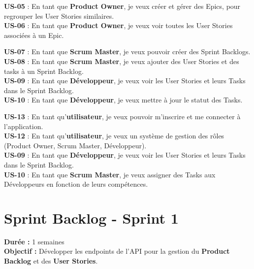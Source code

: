 \documentclass[a4paper,12pt]{article}
\begin{document}
\begin{tcolorbox}[colframe=darkblue,colback=lightgray,title=\textbf{Epic 2 : Gestion des Epics}]
\textbf{US-05} : En tant que \textbf{Product Owner}, je veux créer et gérer des Epics, pour regrouper les User Stories similaires.\\
\textbf{US-06} : En tant que \textbf{Product Owner}, je veux voir toutes les User Stories associées à un Epic.
\end{tcolorbox}

\begin{tcolorbox}[colframe=darkblue,colback=lightgray,title=\textbf{Epic 3 : Gestion du Sprint Backlog}]
\textbf{US-07} : En tant que \textbf{Scrum Master}, je veux pouvoir créer des Sprint Backlogs.\\
\textbf{US-08} : En tant que \textbf{Scrum Master}, je veux ajouter des User Stories et des tasks à un Sprint Backlog.\\
\textbf{US-09} : En tant que \textbf{Développeur}, je veux voir les User Stories et leurs Tasks dans le Sprint Backlog.\\
\textbf{US-10} : En tant que \textbf{Développeur}, je veux mettre à jour le statut des Tasks.
\end{tcolorbox}
\begin{tcolorbox}[colframe=darkblue,colback=lightgray,title=\textbf{Epic 5 : Gestion des utilisateurs et des rôles}]
\textbf{US-13} : En tant qu’\textbf{utilisateur}, je veux pouvoir m’inscrire et me connecter à l’application.\\
\textbf{US-12} : En tant qu’\textbf{utilisateur},  je veux un système de gestion des rôles (Product Owner, Scrum Master, Développeur).\\
\textbf{US-09} : En tant que \textbf{Développeur}, je veux voir les User Stories et leurs Tasks dans le Sprint Backlog.\\
\textbf{US-10} : En tant que \textbf{Scrum Master}, je veux assigner des Tasks aux Développeurs en fonction de leurs compétences.
\end{tcolorbox}
\newpage
\section{Sprint Backlog - Sprint 1}
\textbf{Durée :} 1 semaines\\
\textbf{Objectif :} Développer les endpoints de l’API pour la gestion du \textbf{Product Backlog} et des \textbf{User Stories}.\\
\end{document}
